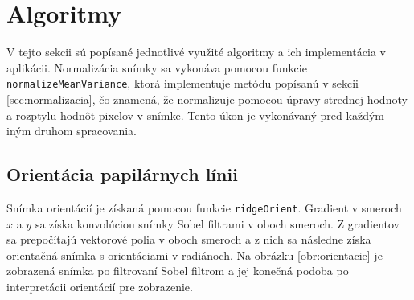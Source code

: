   \section{Algoritmy}
  V tejto sekcii sú popísané jednotlivé využité algoritmy a ich implementácia v aplikácii.
  Normalizácia snímky sa vykonáva pomocou funkcie \texttt{normalizeMeanVariance}, ktorá implementuje metódu
  popísanú v sekcii \ref{sec:normalizacia}, čo znamená, že normalizuje pomocou úpravy strednej hodnoty a rozptylu hodnôt pixelov v snímke. Tento úkon je
  vykonávaný pred každým iným druhom spracovania.

  \subsection{Orientácia papilárnych línii}
  Snímka orientácií je získaná pomocou funkcie \texttt{ridgeOrient}. Gradient v smeroch $x$ a $y$ sa získa konvolúciou snímky Sobel filtrami v oboch smeroch.
  Z gradientov sa prepočítajú vektorové polia v oboch smeroch a z nich sa následne získa orientačná snímka s orientáciami v radiánoch.
  Na obrázku \ref{obr:orientacie} je zobrazená snímka po filtrovaní Sobel filtrom a jej konečná podoba po interpretácii orientácií pre zobrazenie.

